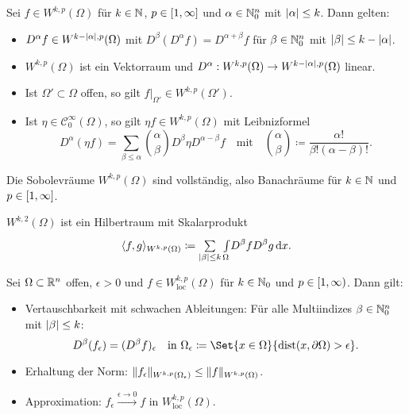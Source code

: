 \documentclass{cheat-sheet}
\DeclareMathOperator{\dist}{dist} %
\newcommand{\scp}[2]{\langle #1 , #2 \rangle} %
\begin{document}

\begin{satz}
  Sei $f \in W^{k,p}(\Omega)$ für $k \in \mathbb{N}$, $p \in \left[ 1, \infty \right]$ und $\alpha \in \mathbb{N}_0^n$ mit $\lvert\alpha\rvert \leq k$. Dann gelten:
  \begin{itemize}
    \item $D^\alpha f \in W^{k - \lvert\alpha\rvert,p}(\Omega)$ mit $D^\beta (D^\alpha f) = D^{\alpha + \beta} f$ für $\beta \in \mathbb{N}_0^n$ mit $\lvert\beta\rvert \leq k - \lvert\alpha\rvert$.
    \item $W^{k,p}(\Omega)$ ist ein Vektorraum und $D^\alpha : W^{k,p}(\Omega) \to W^{k - \lvert\alpha\rvert,p}(\Omega)$ linear.
    \item Ist $\Omega' \subset \Omega$ offen, so gilt $f|_{\Omega'} \in W^{k,p}(\Omega')$.
    \item Ist $\eta \in \mathcal{C}_0^\infty(\Omega)$, so gilt $\eta f \in W^{k,p}(\Omega)$ mit Leibnizformel
    \[
      D^\alpha(\eta f) = \sum_{\beta \leq \alpha} \binom{\alpha}{\beta} D^\beta \eta D^{\alpha - \beta} f
      \quad \text{mit} \quad
      \binom{\alpha}{\beta} \coloneqq \frac{\alpha!}{\beta! (\alpha - \beta)!}.
    \]
  \end{itemize}
\end{satz}

\begin{satz}
  Die Sobolevräume $W^{k,p}(\Omega)$ sind vollständig, also Banachräume für $k \in \mathbb{N}$ und $p \in \left[ 1, \infty \right]$.
\end{satz}

\begin{bem}
  $W^{k,2}(\Omega)$ ist ein Hilbertraum mit Skalarprodukt
  \[
    \scp{f}{g}_{W^{k,p}(\Omega)} \coloneqq \sum_{\abs{\beta} \leq k} \Int{\Omega}{}{D^\beta f D^\beta g}{x}.
  \]
\end{bem}

\begin{satz}
  Sei $\Omega \subset \mathbb{R}^n$ offen, $\epsilon > 0$ und $f \in W^{k,p}_{\text{loc}}(\Omega)$ für $k \in \mathbb{N}_0$ und $p \in \left[ 1, \infty \right)$. Dann gilt:
  \begin{itemize}
    \item Vertauschbarkeit mit schwachen Ableitungen: Für alle Multiindizes $\beta \in \mathbb{N}_0^n$ mit $\lvert\beta\rvert \leq k$:
    \[
      D^\beta (f_{\epsilon}) = (D^\beta f)_{\epsilon}
      \quad \text{in } \Omega_{\epsilon} \coloneqq \Set{x \in \Omega}{ \dist(x, \partial \Omega) > \epsilon }.
    \]
    \item Erhaltung der Norm: $\lVert f_\epsilon\rVert_{W^{k,p}(\Omega_\epsilon)} \leq \lVert f\rVert_{W^{k,p}(\Omega)}$.
    \item Approximation: $f_\epsilon \xrightarrow{\epsilon \to 0} f$ in $W^{k,p}_{\text{loc}}(\Omega)$.
  \end{itemize}
\end{satz}
\end{document}
